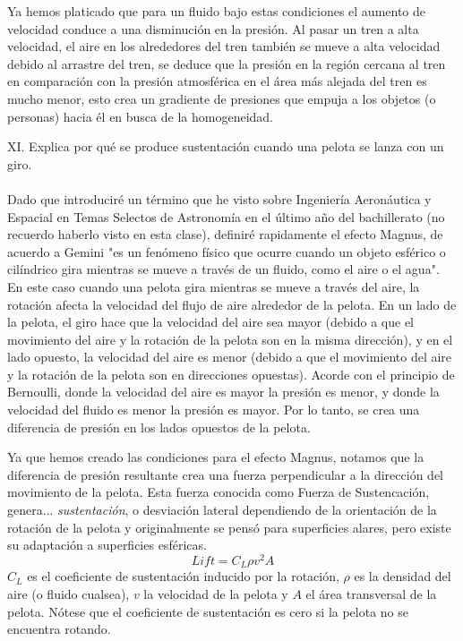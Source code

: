 \documentclass{article}
\begin{document}
Ya hemos platicado que para un fluido bajo estas condiciones el aumento de velocidad conduce a una disminución en la presión. Al pasar un tren a alta velocidad, el aire en los alrededores del tren también se mueve a alta velocidad debido al arrastre del tren, se deduce que la presión en la región cercana al tren en comparación con la presión atmosférica en el área más alejada del tren es mucho menor, esto crea un gradiente de presiones que empuja a los objetos (o personas) hacia él en busca de la homogeneidad.

\noindent XI. Explica por qué se produce sustentación cuando una pelota se lanza con un giro. \\\\

Dado que introduciré un término que he visto sobre Ingeniería Aeronáutica y Espacial en Temas Selectos de Astronomía en el último año del bachillerato (no recuerdo haberlo visto en esta clase), definiré rapidamente el efecto Magnus, de acuerdo a Gemini "es un fenómeno físico que ocurre cuando un objeto esférico o cilíndrico gira mientras se mueve a través de un fluido, como el aire o el agua".\\
En este caso cuando una pelota gira mientras se mueve a través del aire, la rotación afecta la velocidad del flujo de aire alrededor de la pelota. En un lado de la pelota, el giro hace que la velocidad del aire sea mayor (debido a que el movimiento del aire y la rotación de la pelota son en la misma dirección), y en el lado opuesto, la velocidad del aire es menor (debido a que el movimiento del aire y la rotación de la pelota son en direcciones opuestas). Acorde con el principio de Bernoulli, donde la velocidad del aire es mayor la presión es menor, y donde la velocidad del fluido es menor la presión es mayor. Por lo tanto, se crea una diferencia de presión en los lados opuestos de la pelota. 

Ya que hemos creado las condiciones para el efecto Magnus, notamos que la diferencia de presión resultante crea una fuerza perpendicular a la dirección del movimiento de la pelota. Esta fuerza conocida como Fuerza de Sustencación, genera... \textit{sustentación}, o desviación lateral dependiendo de la orientación de la rotación de la pelota y originalmente se pensó para superficies alares, pero existe su adaptación a superficies esféricas.
\begin{equation*}
    \textit{Lift} = C_L\rho v^2 A
\end{equation*}
$C_L$ es el coeficiente de sustentación inducido por la rotación, $\rho$ es la densidad del aire (o fluido cualsea), $v$ la velocidad de la pelota y $A$ el área transversal de la pelota. Nótese que el coeficiente de sustentación es cero si la pelota no se encuentra rotando.
\end{document}

